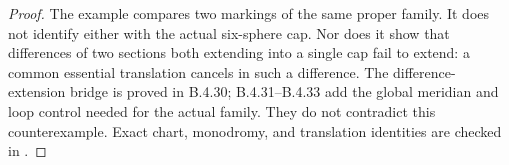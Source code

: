 \begin{proof}
The example compares two markings of the same
proper family. It does not identify either
with the actual six-sphere cap. Nor does it
show that differences of two sections both
extending into a single cap fail to extend:
a common essential translation cancels in
such a difference. The difference-extension bridge
is proved in B.4.30; B.4.31--B.4.33 add the global
meridian and loop control needed for the actual family.
They do not contradict this counterexample. Exact chart,
monodromy, and translation identities are
checked in
.
\end{proof}
